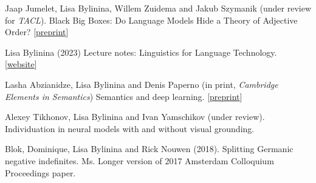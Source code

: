 \documentclass[12pt,letterpaper]{article}
\begin{document}
\small{
\begin{hangparas}{.25in}{1} 


%

\vspace{1mm} 

Jaap Jumelet, Lisa Bylinina, Willem Zuidema and Jakub Szymanik (under review for {\it TACL}). Black Big Boxes: Do Language Models Hide a Theory of Adjective Order? [\href{https://arxiv.org/abs/2407.02136}{preprint}]

\vspace{1mm} 

Lisa Bylinina (2023) Lecture notes: Linguistics for Language Technology. [\href{https://bylinina.github.io/ling_course/}{website}] 

\vspace{1mm} 

Lasha Abzianidze, Lisa Bylinina and Denis Paperno (in print, {\it Cambridge Elements in Semantics}) Semantics and deep learning. [\href{https://ling.auf.net/lingbuzz/007736}{preprint}]

\vspace{1mm} 

Alexey Tikhonov, Lisa Bylinina and Ivan Yamschikov (under review). Individuation in neural models with and without visual grounding.

\vspace{1mm} 


\vspace{1mm} 

%

Blok, Dominique, Lisa Bylinina and Rick Nouwen (2018). Splitting Germanic negative indefinites. Ms. Longer version of 2017 Amsterdam Colloquium Proceedings paper.

\vspace{1mm} 


\end{hangparas}}
\end{document}
